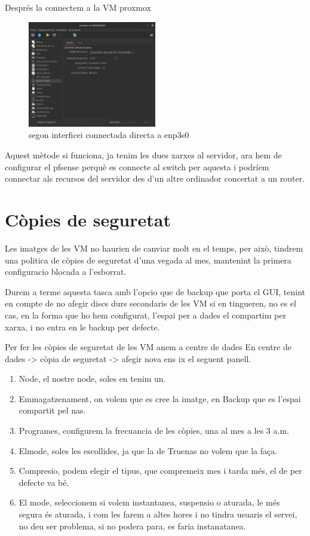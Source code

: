 \documentclass[
  10pt,
]{krantz}
\providecommand{\tightlist}{%
  \setlength{\itemsep}{0pt}\setlength{\parskip}{0pt}}
\begin{document}
Després la connectem a la VM proxmox

\begin{figure}
\centering
\includegraphics[width=0.5\textwidth,height=\textheight]{imatges/proxmox/macvtap.png}
\caption{segon interficei connectada directa a enp3s0}
\end{figure}

Aquest mètode si funciona, ja tenim les dues xarxes al servidor, ara hem de configurar el pfsense perquè es connecte al switch per aquesta i podríem connectar als recursos del servidor des d'un altre ordinador concertat a un router.

\hypertarget{cuxf2pies-de-seguretat}{%
\section{Còpies de seguretat}\label{cuxf2pies-de-seguretat}}

Les imatges de les VM no haurien de canviar molt en el temps, per això, tindrem una politica de còpies de seguretat d'una vegada al mes, mantenint la primera configuracio blocada a l'esborrat.

Durem a terme aquesta tasca amb l'opcio que de backup que porta el GUI, tenint en compte de no afegir discs durs secondaris de les VM si en tingueren, no es el cas, en la forma que ho hem configurat, l'espai per a dades el compartim per xarxa, i no entra en le backup per defecte.

Per fer les còpies de seguretat de les VM anem a centre de dades En centre de dades -\textgreater{} còpia de seguretat -\textgreater{} afegir nova ens ix el seguent panell.

\begin{enumerate}
\def\labelenumi{\arabic{enumi}.}
\tightlist
\item
  Node, el nostre node, soles en tenim un.
\item
  Emmagatzenament, on volem que es cree la imatge, en Backup que es l'espai compartit pel nas.
\item
  Programes, configurem la frecuancia de les còpies, una al mes a les 3 a.m.
\item
  Elmode, soles les escollides, ja que la de Truenas no volem que la faça.
\item
  Compresio, podem elegir el tipus, que compremeix mes i tarda més, el de per defecte va bé.
\item
  El mode, seleccionem si volem instantanea, suspensio o aturada, le més segura és aturada, i com les farem a altes hores i no tindra usuaris el servei, no deu ser problema, si no podera para, es faria instanatanea.
\end{enumerate}
\end{document}
